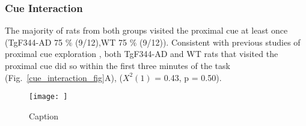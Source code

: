 \documentclass[fleqn,10pt]{wlscirep}
\begin{document}

\subsubsection*{Cue Interaction} 
The majority of rats from both groups visited the proximal cue at least once (TgF344-AD 75 $\%$ (9/12),WT 75 $\%$ (9/12)). Consistent with previous studies of proximal cue exploration \cite{}, both TgF344-AD and WT rats that visited the proximal cue did so within the first three minutes of the task (Fig.~\ref{cue_interaction_fig}A), ($X^2(1)$ = 0.43, p = 0.50). 

\begin{figure}
    \centering
    \texttt{[image: ]}
    \caption{Caption}
    \label{homebase_fig}
\end{figure}
\end{document}
